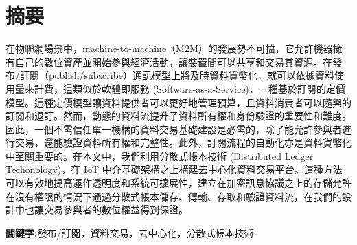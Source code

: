 \begin{center}
\vspace{0.5cm}


\end{center}
\restoregeometry
\clearpage
{}

\newpage
{}
\thispagestyle{empty}

\clearpage

\clearpage

\setcounter{page}{1}
\newpage
{}
\chapter*{摘要}
\pagestyle{plain}

\begin{spacing}{2.0}

在物聯網場景中，machine-to-machine（M2M）的發展勢不可擋，它允許機器擁有自己的數位資產並開始參與經濟活動，讓裝置間可以共享和交易其資源。在發布/訂閱（publish/subscribe）通訊模型上將及時資料貨幣化，就可以依據資料使用量來計費，這類似於軟體即服務 (Software-as-a-Service)，一種基於訂閱的定價模型。這種定價模型讓資料提供者可以更好地管理預算，且資料消費者可以隨興的訂閱和退訂。然而，動態的資料流提升了資料所有權和身份驗證的重要性和難度。因此，一個不需信任單一機構的資料交易基礎建設是必需的，除了能允許參與者進行交易，還能驗證資料所有權和完整性。此外，訂閱流程的自動化亦是資料貨幣化中至關重要的。在本文中，我們利用分散式帳本技術 (Distributed Ledger Techonology)，在 IoT 中介基礎架構之上構建去中心化資料交易平台。這種方法可以有效地提高運作透明度和系統可擴展性，建立在加密訊息協議之上的存儲允許在沒有權限的情況下通過分散式帳本儲存、傳輸、存取和驗證資料流，在我們的設計中也讓交易參與者的數位權益得到保證。

\end{spacing}

\par{\noindent \bf 關鍵字:}{發布/訂閱，資料交易，去中心化，分散式帳本技術}
\clearpage
{}

